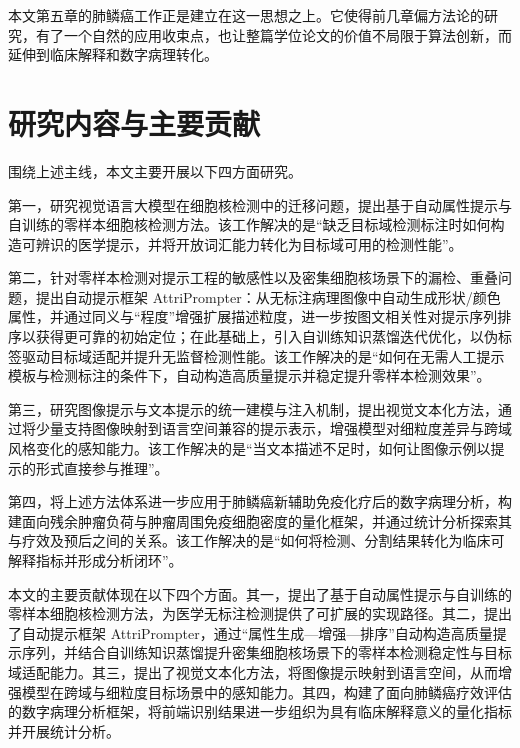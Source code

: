 本文第五章的肺鳞癌工作正是建立在这一思想之上。它使得前几章偏方法论的研究，有了一个自然的应用收束点，也让整篇学位论文的价值不局限于算法创新，而延伸到临床解释和数字病理转化。

\section{研究内容与主要贡献}
围绕上述主线，本文主要开展以下四方面研究。

第一，研究视觉语言大模型在细胞核检测中的迁移问题，提出基于自动属性提示与自训练的零样本细胞核检测方法。该工作解决的是“缺乏目标域检测标注时如何构造可辨识的医学提示，并将开放词汇能力转化为目标域可用的检测性能”。

第二，针对零样本检测对提示工程的敏感性以及密集细胞核场景下的漏检、重叠问题，提出自动提示框架 AttriPrompter：从无标注病理图像中自动生成形状/颜色属性，并通过同义与“程度”增强扩展描述粒度，进一步按图文相关性对提示序列排序以获得更可靠的初始定位；在此基础上，引入自训练知识蒸馏迭代优化，以伪标签驱动目标域适配并提升无监督检测性能。该工作解决的是“如何在无需人工提示模板与检测标注的条件下，自动构造高质量提示并稳定提升零样本检测效果”。

第三，研究图像提示与文本提示的统一建模与注入机制，提出视觉文本化方法，通过将少量支持图像映射到语言空间兼容的提示表示，增强模型对细粒度差异与跨域风格变化的感知能力。该工作解决的是“当文本描述不足时，如何让图像示例以提示的形式直接参与推理”。

第四，将上述方法体系进一步应用于肺鳞癌新辅助免疫化疗后的数字病理分析，构建面向残余肿瘤负荷与肿瘤周围免疫细胞密度的量化框架，并通过统计分析探索其与疗效及预后之间的关系。该工作解决的是“如何将检测、分割结果转化为临床可解释指标并形成分析闭环”。

本文的主要贡献体现在以下四个方面。其一，提出了基于自动属性提示与自训练的零样本细胞核检测方法，为医学无标注检测提供了可扩展的实现路径。其二，提出了自动提示框架 AttriPrompter，通过“属性生成—增强—排序”自动构造高质量提示序列，并结合自训练知识蒸馏提升密集细胞核场景下的零样本检测稳定性与目标域适配能力。其三，提出了视觉文本化方法，将图像提示映射到语言空间，从而增强模型在跨域与细粒度目标场景中的感知能力。其四，构建了面向肺鳞癌疗效评估的数字病理分析框架，将前端识别结果进一步组织为具有临床解释意义的量化指标并开展统计分析。


